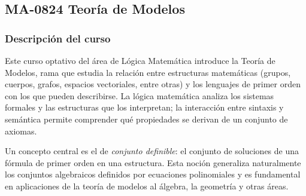 \newpage
\subsection*{MA-0824 Teoría de Modelos}

\hypertarget{MA0824}{}
\begin{refsection}
\begin{table}[H]
\end{table}

\subsubsection*{Descripción del curso}

Este curso optativo del área de Lógica Matemática introduce la Teoría de Modelos, rama que estudia la relación entre estructuras matemáticas (grupos, cuerpos, grafos, espacios vectoriales, entre otras) y los lenguajes de primer orden con los que pueden describirse. La lógica matemática analiza los sistemas formales y las estructuras que los interpretan; la interacción entre sintaxis y semántica permite comprender qué propiedades se derivan de un conjunto de axiomas.

Un concepto central es el de \emph{conjunto definible}: el conjunto de soluciones de una fórmula de primer orden en una estructura. Esta noción generaliza naturalmente los conjuntos algebraicos definidos por ecuaciones polinomiales y es fundamental en aplicaciones de la teoría de modelos al álgebra, la geometría y otras áreas.


\end{refsection}
